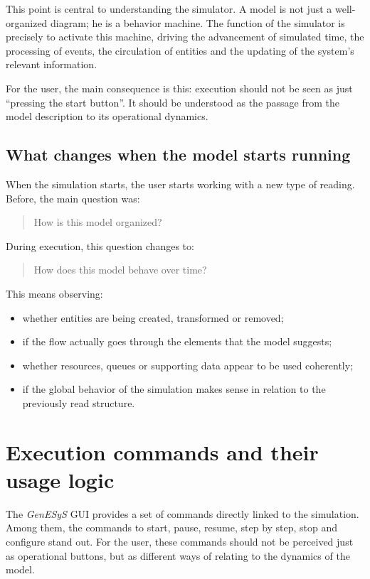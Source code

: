 This point is central to understanding the simulator. A model is not just a well-organized diagram; he is a behavior machine. The function of the simulator is precisely to activate this machine, driving the advancement of simulated time, the processing of events, the circulation of entities and the updating of the system's relevant information.

For the user, the main consequence is this: execution should not be seen as just “pressing the start button”. It should be understood as the passage from the model description to its operational dynamics.

\subsection{What changes when the model starts running}
\label{subsec:cap5_o_que_muda_quando_executa}

When the simulation starts, the user starts working with a new type of reading. Before, the main question was:
\begin{quote}
How is this model organized?
\end{quote}

During execution, this question changes to:
\begin{quote}
How does this model behave over time?
\end{quote}

This means observing:
\begin{itemize}
\item whether entities are being created, transformed or removed;
\item if the flow actually goes through the elements that the model suggests;
\item whether resources, queues or supporting data appear to be used coherently;
\item if the global behavior of the simulation makes sense in relation to the previously read structure.
\end{itemize}

\section{Execution commands and their usage logic}
\label{sec:cap5_comandos_execucao_logica}

The \textit{GenESyS} GUI provides a set of commands directly linked to the simulation. Among them, the commands to start, pause, resume, step by step, stop and configure stand out. For the user, these commands should not be perceived just as operational buttons, but as different ways of relating to the dynamics of the model.

